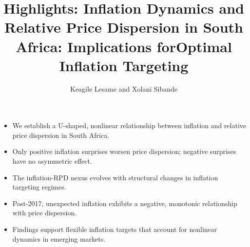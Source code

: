 \documentclass[
  letterpaper,
  DIV=11,
  numbers=noendperiod]{scrartcl}
\title{Highlights: Inflation Dynamics and Relative Price Dispersion in
South Africa: Implications forOptimal Inflation Targeting}
\author{Keagile Lesame and Xolani Sibande}
\date{}
\begin{document}
\maketitle

\begin{itemize}
    \item[•] We establish a U-shaped, nonlinear relationship between inflation and relative price dispersion in South Africa.
    
    \vspace{0.2cm}
    
    \item[•] Only positive inflation surprises worsen price dispersion; negative surprises have no asymmetric effect.
    
    \vspace{0.2cm}
    
    \item[•] The inflation-RPD nexus evolves with structural changes in inflation targeting regimes.
    
    \vspace{0.2cm}
    
    \item[•] Post-2017, unexpected inflation exhibits a negative, monotonic relationship with price dispersion.
    
    \vspace{0.2cm}
    
    \item[•] Findings support flexible inflation targets that account for nonlinear dynamics in emerging markets.
\end{itemize}
\end{document}
